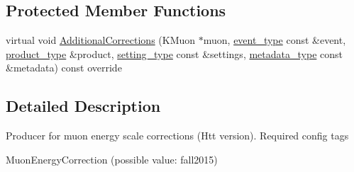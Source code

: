 \subsection*{Protected Member Functions}
\begin{DoxyCompactItemize}
\item 
virtual void \hyperlink{classHttMuonCorrectionsProducer_a26afde578803c883482d80e0e1f6fa76}{AdditionalCorrections} (KMuon $\ast$muon, \hyperlink{classHttMuonCorrectionsProducer_af824f6024adedbe70fe035266dadf478}{event\_\-type} const \&event, \hyperlink{classHttMuonCorrectionsProducer_a3c072777f0a0774ed74f65a8b2ad9266}{product\_\-type} \&product, \hyperlink{classHttMuonCorrectionsProducer_a4533d535084a1cddd6040a94f5121029}{setting\_\-type} const \&settings, \hyperlink{classHttMuonCorrectionsProducer_a476ef6cd31fb12781cc58bba7e4101b8}{metadata\_\-type} const \&metadata) const override
\end{DoxyCompactItemize}


\subsection{Detailed Description}
Producer for muon energy scale corrections (Htt version). Required config tags
\begin{DoxyItemize}
\item MuonEnergyCorrection (possible value: fall2015) 
\end{DoxyItemize}

